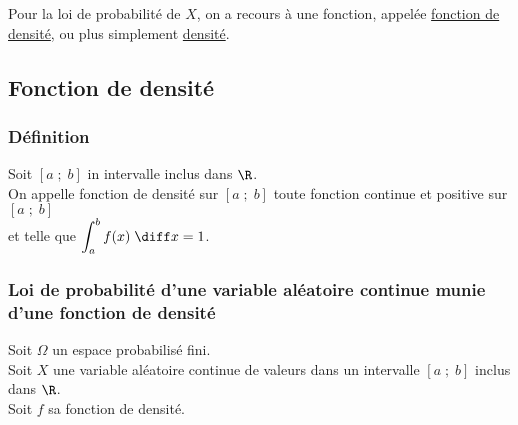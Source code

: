 Pour la loi de probabilité de $X$, on a recours à une fonction, appelée \underline{fonction de densité}, ou plus simplement \underline{densité}.

\subsection{Fonction de densité}

\subsubsection{Définition}

Soit $\left[a \; ; \; b\right]$ in intervalle inclus dans $\R$. \\

On appelle fonction de densité sur $\left[a \; ; \; b\right]$ toute fonction continue et positive sur $\left[a \; ; \; b\right]$ \\ et telle que $\displaystyle{ \int_a^b f(x) \; \diff x} = 1$.

\newpage

\subsubsection{Loi de probabilité d'une variable aléatoire continue munie d'une fonction de densité}

Soit $\Omega$ un espace probabilisé fini. \\
Soit $X$ une variable aléatoire continue de valeurs dans un intervalle $\left[a \; ; \; b\right]$ inclus dans $\R$. \\
Soit $f$ sa fonction de densité. \\

